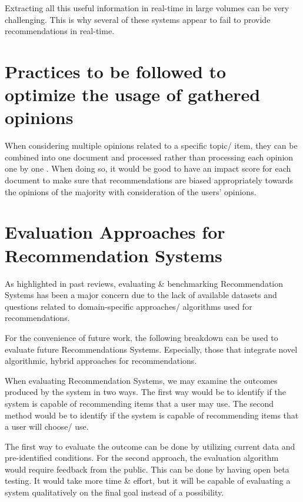 \documentclass[manuscript,screen,natbib=false]{acmart}
\begin{document}
Extracting all this useful information in real-time in large volumes can be very challenging. This is why several of these systems appear to fail to provide recommendations in real-time.

\section{Practices to be followed to optimize the usage of gathered opinions}
When considering multiple opinions related to a specific topic/ item, they can be combined into one document and processed rather than processing each opinion one by one \cite{nah_opinion_2018}. When doing so, it would be good to have an impact score for each document to make sure that recommendations are biased appropriately towards the opinions of the majority with consideration of the users' opinions.



\section{Evaluation Approaches for Recommendation Systems}

As highlighted in past reviews, evaluating \& benchmarking Recommendation Systems has been a major concern due to the lack of available datasets and questions related to domain-specific approaches/ algorithms used for recommendations.

For the convenience of future work, the following breakdown can be used to evaluate future Recommendations Systems. Especially, those that integrate novel algorithmic, hybrid approaches for recommendations.

\bigbreak
When evaluating Recommendation Systems, we may examine the outcomes produced by the system in two ways.
The first way would be to identify if the system is capable of recommending items that a user may use. The second method would be to identify if the system is capable of recommending items that a user will choose/ use.

The first way to evaluate the outcome can be done by utilizing current data and pre-identified conditions. For the second approach, the evaluation algorithm would require feedback from the public. This can be done by having open beta testing. It would take more time \& effort, but it will be capable of evaluating a system qualitatively on the final goal instead of a possibility.
\end{document}
